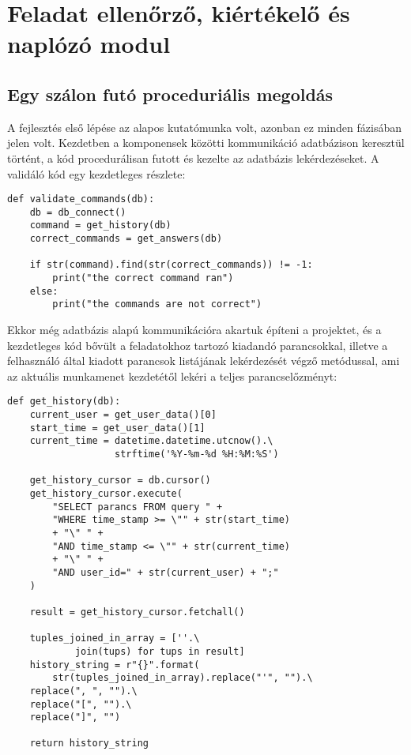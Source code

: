 \documentclass[12pt]{report}
\begin{document}
\chapter{Feladat ellenőrző, kiértékelő és naplózó modul}
\section{Egy szálon futó proceduriális megoldás}

A fejlesztés első lépése az alapos kutatómunka volt, azonban ez minden fázisában jelen volt. Kezdetben a komponensek közötti kommunikáció adatbázison keresztül történt, a kód procedurálisan futott és kezelte az adatbázis lekérdezéseket. A validáló kód egy kezdetleges részlete:

\begin{verbatim}
def validate_commands(db):
    db = db_connect()
    command = get_history(db)
    correct_commands = get_answers(db)

    if str(command).find(str(correct_commands)) != -1:
        print("the correct command ran")
    else:
        print("the commands are not correct")
\end{verbatim}

Ekkor még adatbázis alapú kommunikációra akartuk építeni a projektet, és a kezdetleges kód bővült a feladatokhoz tartozó kiadandó parancsokkal, illetve a felhasználó által kiadott parancsok listájának lekérdezését végző metódussal, ami az aktuális munkamenet kezdetétől lekéri a teljes parancselőzményt:

\begin{verbatim}
def get_history(db):
    current_user = get_user_data()[0]
    start_time = get_user_data()[1]
    current_time = datetime.datetime.utcnow().\
                   strftime('%Y-%m-%d %H:%M:%S')

    get_history_cursor = db.cursor()
    get_history_cursor.execute(
        "SELECT parancs FROM query " +
        "WHERE time_stamp >= \"" + str(start_time) 
        + "\" " +
        "AND time_stamp <= \"" + str(current_time)
        + "\" " +
        "AND user_id=" + str(current_user) + ";"
    )

    result = get_history_cursor.fetchall()

    tuples_joined_in_array = [''.\
            join(tups) for tups in result]
    history_string = r"{}".format(
        str(tuples_joined_in_array).replace("'", "").\
    replace(", ", "").\
    replace("[", "").\
    replace("]", "")

    return history_string
\end{verbatim}
\end{document}
